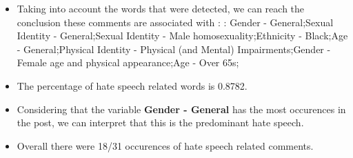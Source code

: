 \documentclass[11pt]{article}
\begin{document}
\begin{itemize}\item Taking into account the words that were detected, we can reach the conclusion these comments are associated with : : Gender - General;Sexual Identity - General;Sexual Identity - Male homosexuality;Ethnicity - Black;Age - General;Physical Identity - Physical (and Mental) Impairments;Gender - Female age and physical appearance;Age - Over 65s;%

\item The percentage of hate speech related words is 0.8782.

\item Considering that the variable \textbf{Gender - General} has the most occurences in the post, we can interpret that this is the predominant hate speech.

\item Overall there were 18/31 occurences of hate speech related comments.\end{itemize}
\end{document}
